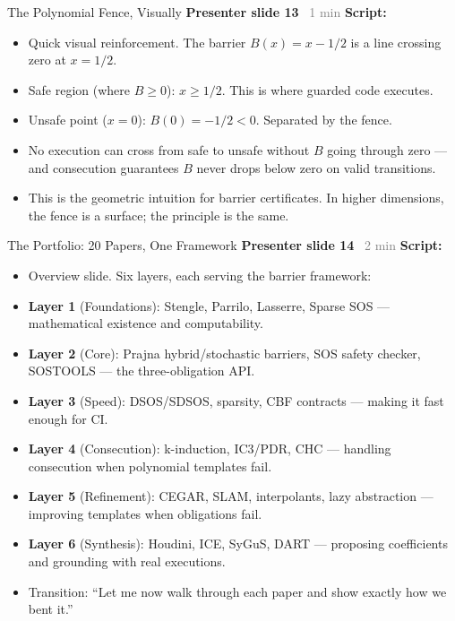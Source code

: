 \documentclass[aspectratio=169]{beamer}
\newcommand{\syncline}[2]{\textbf{#1} \hfill \textcolor{gray}{#2}}
\begin{document}
\begin{frame}{The Polynomial Fence, Visually}
\syncline{Presenter slide 13}{~1 min}
\textbf{Script:}
\begin{itemize}
  \item Quick visual reinforcement. The barrier $B(x) = x - 1/2$ is a line crossing zero at $x = 1/2$.
  \item Safe region (where $B \ge 0$): $x \ge 1/2$. This is where guarded code executes.
  \item Unsafe point ($x = 0$): $B(0) = -1/2 < 0$. Separated by the fence.
  \item No execution can cross from safe to unsafe without $B$ going through zero --- and consecution guarantees $B$ never drops below zero on valid transitions.
  \item This is the geometric intuition for barrier certificates. In higher dimensions, the fence is a surface; the principle is the same.
\end{itemize}
\end{frame}


\begin{frame}{The Portfolio: 20 Papers, One Framework}
\syncline{Presenter slide 14}{~2 min}
\textbf{Script:}
\begin{itemize}
  \item Overview slide. Six layers, each serving the barrier framework:
  \item \textbf{Layer 1} (Foundations): Stengle, Parrilo, Lasserre, Sparse SOS --- mathematical existence and computability.
  \item \textbf{Layer 2} (Core): Prajna hybrid/stochastic barriers, SOS safety checker, SOSTOOLS --- the three-obligation API.
  \item \textbf{Layer 3} (Speed): DSOS/SDSOS, sparsity, CBF contracts --- making it fast enough for CI.
  \item \textbf{Layer 4} (Consecution): k-induction, IC3/PDR, CHC --- handling consecution when polynomial templates fail.
  \item \textbf{Layer 5} (Refinement): CEGAR, SLAM, interpolants, lazy abstraction --- improving templates when obligations fail.
  \item \textbf{Layer 6} (Synthesis): Houdini, ICE, SyGuS, DART --- proposing coefficients and grounding with real executions.
  \item Transition: ``Let me now walk through each paper and show exactly how we bent it.''
\end{itemize}
\end{frame}
\end{document}
